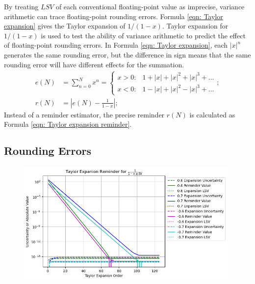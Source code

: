 \documentclass[twoside]{article}
\numberwithin{equation}{section}
\begin{document}
By treating $LSV$ of each conventional floating-point value as imprecise, variance arithmetic can trace floating-point rounding errors.
Formula \eqref{eqn: Taylor expansion} gives the Taylor expansion of $1/(1 - x)$.
Taylor expansion for $1/(1-x)$ is used to test the ability of variance arithmetic to predict the effect of floating-point rounding errors.
In Formula \eqref{eqn: Taylor expansion}, each $|x|^n$ generates the same rounding error, but the difference in sign means that the same rounding error will have different effects for the summation. 
\begin{align}
\label{eqn: Taylor expansion}
e(N) &= \sum_{n = 0}^{N} x^n = \begin{cases} 
x > 0: &1 + |x| + |x|^2 + |x|^3 + \dots \\
x < 0: & 1 - |x| + |x|^2 - |x|^3 + \dots
\end{cases}; \\
\label{eqn: Taylor expansion reminder}
r(N) & = \left| e(N) - \frac{1}{1-x} \right|;
\end{align}
Instead of a reminder estimator, the precise reminder $r(N)$ is calculated as Formula \eqref{eqn: Taylor expansion reminder}.



\subsection{Rounding Errors}

\begin{figure}[p]
\centering
\includegraphics[height=2.4in]{Taylor_Expansion_Uncertainty.png} 
\label{fig: Taylor_Expansion_Uncertainty}
\end{figure}
\end{document}
